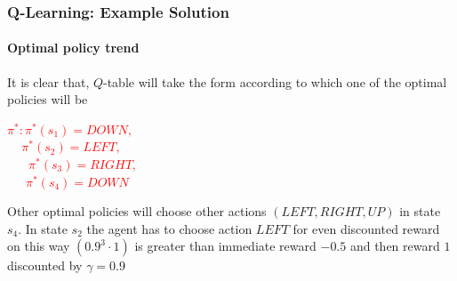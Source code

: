 \begin{frame}
	\frametitle{Q-Learning: Example Solution}
	\framesubtitle{Optimal policy trend}
	
	\large
	
	\vspace{0.2cm}
	
	It is clear that, $ Q $-table will take the form according to which one of the optimal
	policies will be \\
	
	\vspace{-0.2cm}
	
	\begin{center}
		\textcolor{red}{$ \pi^* : \pi^*(s_1) = DOWN, $} \\
		\textcolor{red}{$ \;\;\;\,\, \pi^*(s_2) = LEFT, $} \\
		\textcolor{red}{$ \;\;\;\;\;\,\, \pi^*(s_3) = RIGHT, $} \\
		\textcolor{red}{$ \;\;\;\,\,\,\, \pi^*(s_4) = DOWN $}
	\end{center}
	
	\vspace{-0.2cm}
	
	Other optimal policies will choose other actions $ (LEFT,RIGHT,UP) $ in state $ s_4 $.
	In state $ s_2 $ the agent has to choose action $ LEFT $ for even discounted reward on
	this way $ (0.9^3 \cdot 1) $ is greater than immediate reward $ -0.5 $ and then reward
	$ 1 $ discounted by $ \gamma = 0.9 $ \\
\end{frame}
